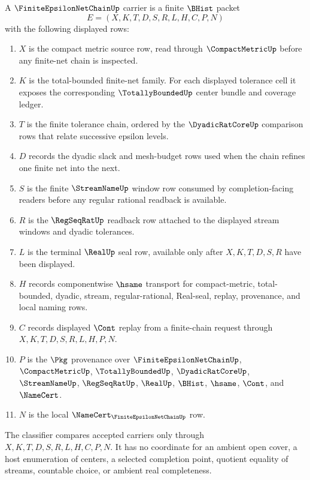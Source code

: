 \begin{definition}
\label{def:finite-epsilon-net-chain-carrier}
A $\FiniteEpsilonNetChainUp$ carrier is a finite $\BHist$ packet
$$
E=(X,K,T,D,S,R,L,H,C,P,N)
$$
with the following displayed rows:
\begin{enumerate}
\item $X$ is the compact metric source row, read through $\CompactMetricUp$ before any finite-net chain is inspected.
\item $K$ is the total-bounded finite-net family. For each displayed tolerance cell it exposes the corresponding $\TotallyBoundedUp$ center bundle and coverage ledger.
\item $T$ is the finite tolerance chain, ordered by the $\DyadicRatCoreUp$ comparison rows that relate successive epsilon levels.
\item $D$ records the dyadic slack and mesh-budget rows used when the chain refines one finite net into the next.
\item $S$ is the finite $\StreamNameUp$ window row consumed by completion-facing readers before any regular rational readback is available.
\item $R$ is the $\RegSeqRatUp$ readback row attached to the displayed stream windows and dyadic tolerances.
\item $L$ is the terminal $\RealUp$ seal row, available only after $X,K,T,D,S,R$ have been displayed.
\item $H$ records componentwise $\hsame$ transport for compact-metric, total-bounded, dyadic, stream, regular-rational, Real-seal, replay, provenance, and local naming rows.
\item $C$ records displayed $\Cont$ replay from a finite-chain request through $X,K,T,D,S,R,L,H,P,N$.
\item $P$ is the $\Pkg$ provenance over $\FiniteEpsilonNetChainUp$, $\CompactMetricUp$, $\TotallyBoundedUp$, $\DyadicRatCoreUp$, $\StreamNameUp$, $\RegSeqRatUp$, $\RealUp$, $\BHist$, $\hsame$, $\Cont$, and $\NameCert$.
\item $N$ is the local $\NameCert_{\FiniteEpsilonNetChainUp}$ row.
\end{enumerate}
The classifier compares accepted carriers only through $X,K,T,D,S,R,L,H,C,P,N$. It has no coordinate for an ambient open cover, a host enumeration of centers, a selected completion point, quotient equality of streams, countable choice, or ambient real completeness.
\end{definition}


